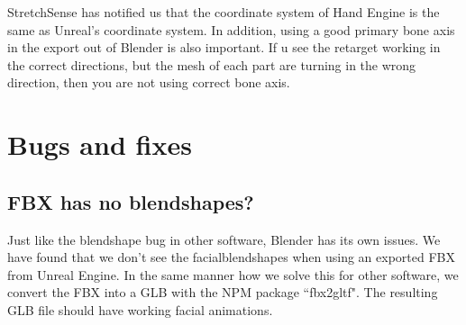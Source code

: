 \documentclass{uva-inf-article}
\begin{document}
StretchSense has notified us that the coordinate system of Hand Engine is the same as Unreal's coordinate system. In addition, using a good primary bone axis in the export out of Blender is also important. If u see the retarget working in the correct directions, but the mesh of each part are turning in the wrong direction, then you are not using correct bone axis.

\section{Bugs and fixes}
\subsection{FBX has no blendshapes?}
Just like the blendshape bug in other software, Blender has its own issues. We have found that we don't see the facialblendshapes when using an exported FBX from Unreal Engine. In the same manner how we solve this for other software, we convert the FBX into a GLB with the NPM package ``fbx2gltf". The resulting GLB file should have working facial animations.
\end{document}
